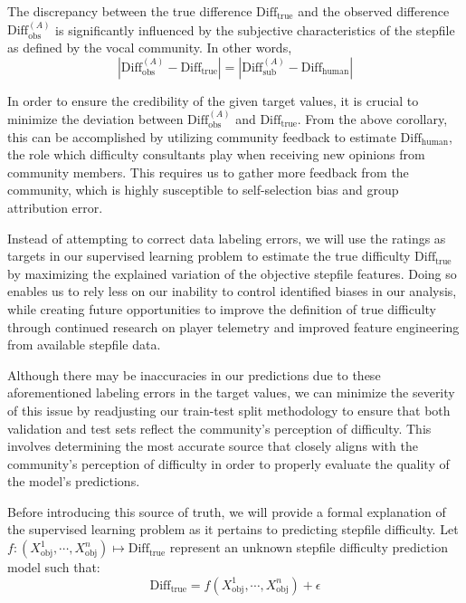 \begin{corollary}
The discrepancy between the true difference $\text{Diff}_{\text{true}}$ and the observed difference $\text{Diff}_{\text{obs}}^{(A)}$ is significantly influenced by the subjective characteristics of the stepfile as defined by the vocal community. In other words,
$$|\text{Diff}_{\text{obs}}^{(A)} - \text{Diff}_{\text{true}}| = |\text{Diff}_{\text{sub}}^{(A)} - \text{Diff}_{\text{human}}|$$
\end{corollary}

In order to ensure the credibility of the given target values, it is crucial to minimize the deviation between $\text{Diff}_{\text{obs}}^{(A)}$ and $\text{Diff}_{\text{true}}$. From the above corollary, this can be accomplished by utilizing community feedback to estimate $\text{Diff}_{\text{human}}$, the role which difficulty consultants play when receiving new opinions from community members. This requires us to gather more feedback from the community, which is highly susceptible to self-selection bias and group attribution error.

\vspace{2mm}

Instead of attempting to correct data labeling errors, we will use the ratings as targets in our supervised learning problem to estimate the true difficulty $\text{Diff}_{\text{true}}$ by maximizing the explained variation of the objective stepfile features. Doing so enables us to rely less on our inability to control identified biases in our analysis, while creating future opportunities to improve the definition of true difficulty through continued research on player telemetry and improved feature engineering from available stepfile data.
\vspace{2mm} 

Although there may be inaccuracies in our predictions due to these aforementioned labeling errors in the target values, we can minimize the severity of this issue by readjusting our train-test split methodology to ensure that both validation and test sets reflect the community's perception of difficulty. This involves determining the most accurate source that closely aligns with the community's perception of difficulty in order to properly evaluate the quality of the model's predictions.
\vspace{2mm}

Before introducing this source of truth, we will provide a formal explanation of the supervised learning problem as it pertains to predicting stepfile difficulty. Let $f: (X_{\text{obj}}^1, \cdots, X_{\text{obj}}^n) \mapsto \text{Diff}_{\text{true}}$ represent an unknown stepfile difficulty prediction model such that:
$$\text{Diff}_{\text{true}} = f(X_{\text{obj}}^1, \cdots, X_{\text{obj}}^n) + \epsilon$$

